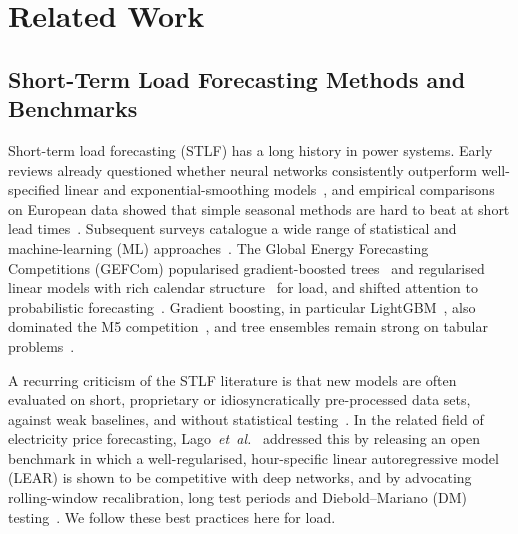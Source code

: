 \section{Related Work}
\label{sec:related}

\subsection{Short-Term Load Forecasting Methods and Benchmarks}
Short-term load forecasting (STLF) has a long history in power systems. Early reviews already questioned whether neural networks consistently outperform well-specified linear and exponential-smoothing models~\cite{hippert2001nn}, and empirical comparisons on European data showed that simple seasonal methods are hard to beat at short lead times~\cite{taylor2007european,taylor2010triple}. Subsequent surveys catalogue a wide range of statistical and machine-learning (ML) approaches~\cite{kuster2017review,haben2021lv,wang2019smartmeter,hong2020outlook}. The Global Energy Forecasting Competitions (GEFCom) popularised gradient-boosted trees~\cite{lloyd2014gefcom2012} and regularised linear models with rich calendar structure~\cite{ziel2016lasso} for load, and shifted attention to probabilistic forecasting~\cite{hong2016gefcom2014,hong2016tutorial,hong2019gefcom2017}. Gradient boosting, in particular LightGBM~\cite{ke2017lightgbm}, also dominated the M5 competition~\cite{makridakis2022m5}, and tree ensembles remain strong on tabular problems~\cite{grinsztajn2022tabular}.

A recurring criticism of the STLF literature is that new models are often evaluated on short, proprietary or idiosyncratically pre-processed data sets, against weak baselines, and without statistical testing~\cite{hong2020outlook,petropoulos2022forecasting}. In the related field of electricity price forecasting, Lago~\emph{et~al.}~\cite{lago2021benchmark} addressed this by releasing an open benchmark in which a well-regularised, hour-specific linear autoregressive model (LEAR) is shown to be competitive with deep networks, and by advocating rolling-window recalibration, long test periods and Diebold--Mariano (DM) testing~\cite{diebold1995dm,harvey1997hln,ziel2018multivariate}. We follow these best practices here for load.

